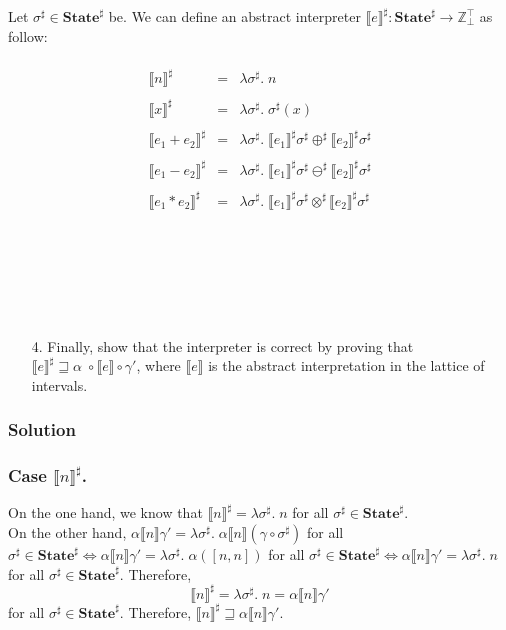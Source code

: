 \documentclass{article}
\newcommand{\sem}[1]{\llbracket #1 \rrbracket}
\newcommand{\state}{\textbf{State}}
\newcommand{\ztop}{\mathbb{Z}_{\bot}^{\top}}
\newcommand{\pl}{\oplus^{\sharp}}
\newcommand{\tl}{\otimes^{\sharp}}
\newcommand{\ml}{\ominus^{\sharp}}
\newcommand{\sgs}{\sigma^{\sharp}}
\newcommand{\seme}{\sem{e}}
\newcommand{\ssem}{\seme^{\sharp}}
\newcommand{\ssx}[1]{\sem{#1}^{\sharp}}
\begin{document}
Let $\sgs \in \state^{\sharp}$ be. We can define an abstract interpreter $\llbracket e \rrbracket^{\sharp}: \state^{\sharp} \longrightarrow \ztop$ as follow:\\\\
\begin{equation*}
\begin{array}{rll}
      \llbracket n \rrbracket^{\sharp} & = & \lambda \sgs . \; n  \\\\
      \llbracket x \rrbracket^{\sharp} & = & \lambda \sgs . \; \sgs(x)  \\\\
      \llbracket e_1 + e_2 \rrbracket^{\sharp} & = & \lambda \sgs . \; \llbracket e_1 \rrbracket^{\sharp} \sgs \pl \llbracket e_2 \rrbracket^{\sharp} \sgs  \\\\
      \llbracket e_1 - e_2 \rrbracket^{\sharp} & = & \lambda \sgs . \; \llbracket e_1 \rrbracket^{\sharp} \sgs \ml \llbracket e_2 \rrbracket^{\sharp} \sgs  \\\\
      \llbracket e_1 * e_2 \rrbracket^{\sharp} & = & \lambda \sgs . \; \llbracket e_1 \rrbracket^{\sharp} \sgs \tl \llbracket e_2 \rrbracket^{\sharp} \sgs  \\\\
        
\end{array}
\end{equation*}\\\\\\\\\\
\begin{enumerate}
\item[4.] Finally, show that the interpreter is correct by proving that $\ssem \sqsupseteq \alpha \; \circ \seme \circ \gamma'$, where $\seme$ is the abstract interpretation in the lattice of intervals.
\end{enumerate}
\subsubsection*{Solution}
\subsubsection*{Case $\ssx{n}$.}
On the one hand, we know that $\ssx{n} = \lambda \sgs. \; n$ for all $\sgs \in \state^{\sharp}$.\\
On the other hand, $\alpha \sem{n} \gamma' = \lambda \sgs .\; \alpha \sem{n}\left(\gamma \circ \sgs\right)$ for all $\sgs \in \state^{\sharp} \iff \alpha \sem{n} \gamma' = \lambda \sgs. \; \alpha \left( \left[ n,n \right] \right)$ for all $\sgs \in \state^{\sharp} \iff \alpha \sem{n} \gamma' = \lambda \sgs. \; n$ for all $\sgs \in \state^{\sharp}$. Therefore, $$\ssx{n} = \lambda \sgs. \; n = \alpha \sem{n} \gamma'$$ for all $\sgs \in \state^{\sharp}$. Therefore, $\ssx{n} \sqsupseteq \alpha \sem{n} \gamma'$.\\
\end{document}
